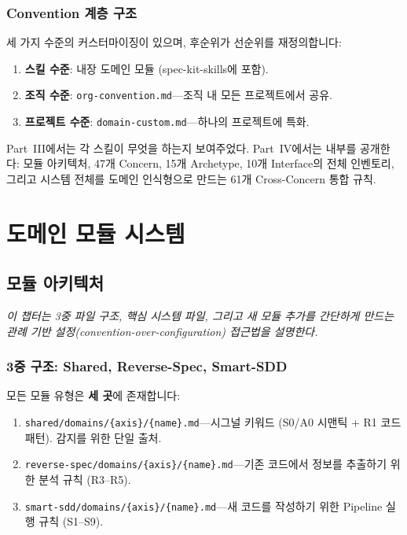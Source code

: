 \documentclass[11pt,a4paper,openright,twoside]{report}
\newcommand{\file}[1]{\texttt{#1}}
\begin{document}
\section{Convention 계층 구조}

세 가지 수준의 커스터마이징이 있으며, 후순위가 선순위를 재정의합니다:

\begin{enumerate}
  \item \textbf{스킬 수준}: 내장 도메인 모듈 (spec-kit-skills에 포함).
  \item \textbf{조직 수준}: \file{org-convention.md}---조직 내 모든 프로젝트에서 공유.
  \item \textbf{프로젝트 수준}: \file{domain-custom.md}---하나의 프로젝트에 특화.
\end{enumerate}

Part~III에서는 각 스킬이 무엇을 하는지 보여주었다. Part~IV에서는 내부를 공개한다: 모듈 아키텍처, 47개 Concern, 15개 Archetype, 10개 Interface의 전체 인벤토리, 그리고 시스템 전체를 도메인 인식형으로 만드는 61개 Cross-Concern 통합 규칙.

\part{도메인 모듈 시스템}

\chapter{모듈 아키텍처}
\label{ch:module-arch}

\textit{이 챕터는 3중 파일 구조, 핵심 시스템 파일, 그리고 새 모듈 추가를 간단하게 만드는 관례 기반 설정(convention-over-configuration) 접근법을 설명한다.}

\section{3중 구조: Shared, Reverse-Spec, Smart-SDD}

모든 모듈 유형은 \textbf{세 곳}에 존재합니다:

\begin{enumerate}
  \item \file{shared/domains/\{axis\}/\{name\}.md}---시그널 키워드 (S0/A0 시맨틱 + R1 코드 패턴). 감지를 위한 단일 출처.
  \item \file{reverse-spec/domains/\{axis\}/\{name\}.md}---기존 코드에서 정보를 추출하기 위한 분석 규칙 (R3--R5).
  \item \file{smart-sdd/domains/\{axis\}/\{name\}.md}---새 코드를 작성하기 위한 Pipeline 실행 규칙 (S1--S9).
\end{enumerate}
\end{document}
